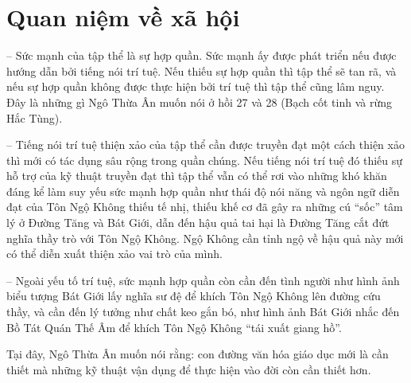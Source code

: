 \section{Quan niệm về xã hội} %
\label{sec:27_28_xa_hoi}

-- Sức mạnh của tập thể là sự hợp quần. Sức mạnh ấy được phát triển nếu được hướng dẫn bởi tiếng nói trí tuệ. Nếu thiếu sự hợp quần thì tập thể sẽ tan rã, và nếu sự hợp quần không được thực hiện bởi trí tuệ thì tập thể cũng lâm nguy. Đây là những gì Ngô Thừa Ân muốn nói ở hồi 27 và 28 (Bạch cốt tinh và rừng Hắc Tùng).

-- Tiếng nói trí tuệ thiện xảo của tập thể cần được truyền đạt một cách thiện xảo thì mới có tác dụng sâu rộng trong quần chúng. Nếu tiếng nói trí tuệ đó thiếu sự hỗ trợ của kỹ thuật truyền đạt thì tập thể vẫn có thể rơi vào những khó khăn đáng kể làm suy yếu sức mạnh hợp quần như thái độ nói năng và ngôn ngữ diễn đạt của Tôn Ngộ Không thiếu tế nhị, thiếu khế cơ đã gây ra những cú ``sốc'' tâm lý ở Đường Tăng và Bát Giới, dẫn đến hậu quả tai hại là Đường Tăng cắt đứt nghĩa thầy trò với Tôn Ngộ Không. Ngộ Không cần tỉnh ngộ về hậu quả này mới có thể diễn xuất thiện xảo vai trò của mình.

-- Ngoài yếu tố trí tuệ, sức mạnh hợp quần còn cần đến tình người như hình ảnh biểu tượng Bát Giới lấy nghĩa sư đệ để khích Tôn Ngộ Không lên đường cứu thầy, và cần đến lý tưởng như chất keo gắn bó, như hình ảnh Bát Giới nhắc đến Bồ Tát Quán Thế Âm để khích Tôn Ngộ Không ``tái xuất giang hồ''.

Tại đây, Ngô Thừa Ân muốn nói rằng: con đường văn hóa giáo dục mới là cần thiết mà những kỹ thuật vận dụng để thực hiện vào đời còn cần thiết hơn.
